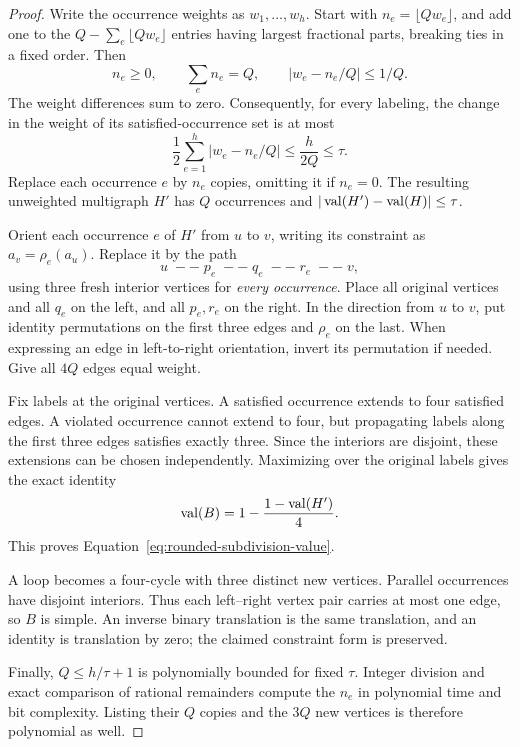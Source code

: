 \begin{proof}
Write the occurrence weights as $w_1,\ldots,w_h$.  Start with
$n_e=\lfloor Qw_e\rfloor$, and add one to the
$Q-\sum_e\lfloor Qw_e\rfloor$ entries having largest fractional parts,
breaking ties in a fixed order.  Then
\[
 n_e\ge0,\qquad \sum_e n_e=Q,\qquad
 |w_e-n_e/Q|\le1/Q.
\]
The weight differences sum to zero.  Consequently, for every labeling,
the change in the weight of its satisfied-occurrence set is at most
\[
 \frac12\sum_{e=1}^h|w_e-n_e/Q|
 \le\frac{h}{2Q}\le\tau.
\]
Replace each occurrence $e$ by $n_e$ copies, omitting it if $n_e=0$.
The resulting unweighted multigraph $H'$ has $Q$ occurrences and
$|\operatorname{val}(H')-\operatorname{val}(H)|\le\tau$.

Orient each occurrence $e$ of $H'$ from $u$ to $v$, writing its
constraint as $a_v=\rho_e(a_u)$.  Replace it by the path
\[
 u\;--\;p_e\;--\;q_e\;--\;r_e\;--\;v,
\]
using three fresh interior vertices for \emph{every occurrence}.
Place all original vertices and all $q_e$ on the left, and all
$p_e,r_e$ on the right.  In the direction from $u$ to $v$, put identity
permutations on the first three edges and $\rho_e$ on the last.
When expressing an edge in left-to-right orientation, invert its
permutation if needed.  Give all $4Q$ edges equal weight.

Fix labels at the original vertices.  A satisfied occurrence extends
to four satisfied edges.  A violated occurrence cannot extend to four,
but propagating labels along the first three edges satisfies exactly
three.  Since the interiors are disjoint, these extensions can be
chosen independently.  Maximizing over the original labels gives the
exact identity
\begin{equation}
 \operatorname{val}(B)=1-\frac{1-\operatorname{val}(H')}{4}.
 \label{eq:bipartization-value}
\end{equation}
This proves Equation~\eqref{eq:rounded-subdivision-value}.

A loop becomes a four-cycle with three distinct new vertices.
Parallel occurrences have disjoint interiors.  Thus each left--right
vertex pair carries at most one edge, so $B$ is simple.  An inverse
binary translation is the same translation, and an identity is
translation by zero; the claimed constraint form is preserved.

Finally, $Q\le h/\tau+1$ is polynomially bounded for fixed $\tau$.
Integer division and exact comparison of rational remainders compute
the $n_e$ in polynomial time and bit complexity.  Listing their $Q$
copies and the $3Q$ new vertices is therefore polynomial as well.
\end{proof}

